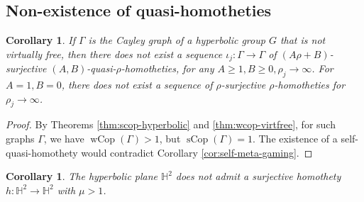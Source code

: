 \documentclass{amsart}
\newtheorem{corollary}[theorem]{Corollary}
\theoremstyle{definition}
\theoremstyle{remark}
\theoremstyle{remark}
\theoremstyle{definition}
\newcommand{\sCop}{\operatorname{sCop}}
\newcommand{\wCop}{\operatorname{wCop}}
\renewcommand{\geq}{\geqslant}
\begin{document}
\subsection{Non-existence of quasi-homotheties}
\begin{corollary}\label{cor:no-homothety-in-hyp-groups}
    If $\Gamma$ is the Cayley graph of a hyperbolic group $G$ that is not virtually free, then there does not exist a sequence $\iota_j \colon \Gamma \to \Gamma$ of $(A \rho+B)$-surjective $(A,B)$-quasi-$\rho$-homotheties, for any $A\geq 1, B\geq 0, \rho_j \to \infty$. For $A=1, B=0$, there does not exist a sequence of $\rho$-surjective $\rho$-homotheties for $\rho_j \to \infty$.
\end{corollary}
\begin{proof}
By Theorems \ref{thm:scop-hyperbolic} and \ref{thm:wcop-virtfree}, for such graphs $\Gamma$, we have $\wCop(\Gamma) > 1$, but $\sCop(\Gamma) = 1$. The existence of a self-quasi-homothety would contradict Corollary \ref{cor:self-meta-gaming}.
\end{proof}
\begin{corollary}\label{cor:no-homothety-in-hyp-plane}
    The hyperbolic plane $\mathbb{H}^2$ does not admit a surjective homothety $h \colon \mathbb{H}^2 \to \mathbb{H}^2$ with $\mu > 1$.
\end{corollary}
\end{document}
